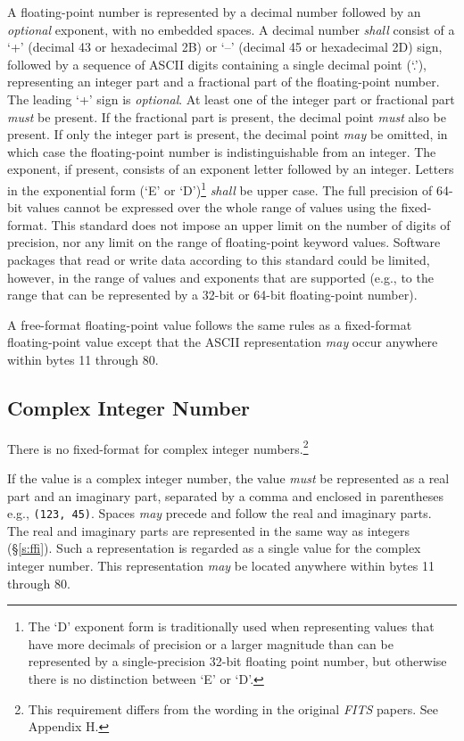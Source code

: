 \documentclass[11pt,makeidx]{book}     %
\begin{document}
   A floating-point number is represented by 
   a decimal number followed by an {\em optional} exponent, with no embedded spaces.  
   A decimal number {\em shall} consist of a `+' (decimal 43 or hexadecimal 2B) or `--'
   (decimal 45 or hexadecimal 2D) sign, followed by a sequence of ASCII digits
   containing a single decimal point (`.'), representing an integer part
   and a fractional part of the floating-point number.  The leading `+'
   sign is {\em optional}.
   At least one of the integer part or fractional part {\em must} be present.  If
   the fractional part is present, the decimal point {\em must} also be present.
   If only the integer part is present, the decimal point {\em may} be omitted,
   in which case the floating-point number is indistinguishable from an integer.
   The exponent, if present, consists of an exponent letter
   followed by an integer. 
   Letters in the exponential form (`E' or `D')\footnote[1]{The `D' exponent
   form is traditionally used when representing values that have more decimals 
   of precision or a larger magnitude than can be represented by a 
   single-precision 32-bit floating point number, but otherwise there
   is no distinction between `E' or `D'.} 
   {\em shall} be upper case.
   The full precision of 64-bit values cannot
   be expressed over the whole range of values using the fixed-format. 
This standard does not impose an upper limit on the number of 
digits of precision, nor any limit on the range of floating-point keyword 
values.  Software packages that read or write 
data according to this standard could be limited, however, in the range of 
values and exponents that are supported (e.g., to the range that 
can be represented by a 32-bit or 64-bit floating-point number).
  
   A free-format floating-point value follows the same rules as a fixed-format 
   floating-point value except that the ASCII representation {\em may} occur 
   anywhere within bytes 11 through 80.
   
   \subsection{Complex Integer Number}
   \label{s:ffci}
   There is no fixed-format for complex integer numbers.\footnote[1]{This 
   requirement differs from the wording in the original 
{\em FITS\/} papers.  See Appendix H.} 
     

   If the value is a complex integer number, the value {\em must} be 
   represented as a real part and an imaginary part,
   separated by a comma and enclosed in parentheses
   e.g., {\tt (123, 45)}.  Spaces {\em may} precede
   and follow the real and imaginary parts.  The real and imaginary
   parts are represented in the same way as integers (\S\ref{s:ffi}).
   Such a representation is
   regarded as a single value for the complex integer number.  This 
   representation {\em may} be located anywhere within bytes 11 through 80.
\end{document}
